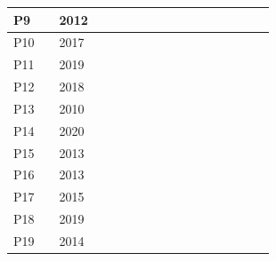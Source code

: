 \documentclass[sigchi, review]{acmart}
\begin{document}
\begin{table}[h]
{\begin{tabular}{ll|l|r|c|c|c|c|c|c|c|c|c|c|c|c|l}
P9             & \citet{gillian2012gesturally}         & 2012                     &    &                     &         &            &             &            &                 &      &&&&&&  \\ \hline
P10            & \citet{liang2017piano}                & 2017                     &    &                     &         &            &             &            &                 &     &&&&&&   \\ \hline
P11            & \citet{granieri2019reach}             & 2019                     &    &                     &         &            &             &            &                 &      &&&&&&  \\ \hline
P12            & \citet{turchet2018some}               & 2018                     &    &                     &         &            &             &            &                 &      &&&&&&  \\ \hline
P13            & \citet{mcpherson2010toward}           & 2010                     &    &                     &         &            &             &            &                 &      &&&&&&  \\ \hline
P14            & \citet{santiniaugmented}              & 2020                     &    &                     &         &            &             &            &                 &      &&&&&&  \\ \hline
P15            & \citet{yang2013visual}                & 2013                     &    &                     &         &            &             &            &                 &      &&&&&&  \\ \hline
P16            & \citet{mcpherson2013portable}         & 2013                     &    &                     &         &            &             &            &                 &     &&&&&&   \\ \hline
P17            & \citet{dahlstedt2015mapping}          & 2015                     &    &                     &         &            &             &            &                 &      &&&&&&  \\ \hline
P18            & \citet{xu20195}                       & 2019                     &    &                     &         &            &             &            &                 &     &&&&&&   \\ \hline
P19            & \citet{zandt2014piaf}                 & 2014                     &    &                     &         &            &             &            &                 &     &&&&&&   \\ \hline

\end{tabular}}
\end{table}
\end{document}
